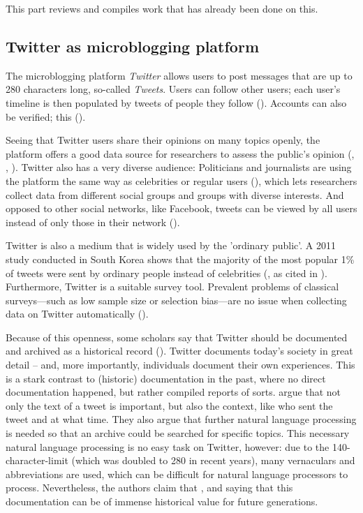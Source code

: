 This part reviews and compiles work that has already been done on this.

\subsection{Twitter as microblogging platform}
The microblogging platform \emph{Twitter} allows users to post messages that are up to 280 characters long, so-called \emph{Tweets}. Users can follow other users; each user's timeline is then populated by tweets of people they follow (\cite{thimm_twitter_2012}). Accounts can also be verified; this  (\cite{twitter_inc_about_nodate-1}). 

Seeing that Twitter users share their opinions on many topics openly, the platform offers a good data source for researchers to assess the public's opinion (\cite{pak2010twitter}, \cite{pfaffenberger2016twitter}, \cite{broniatowski2014twitter}). Twitter also has a very diverse audience: Politicians and journalists are using the platform the same way as celebrities or regular users (\cite{pak2010twitter}), which lets researchers collect data from different social groups and groups with diverse interests. And opposed to other social networks, like Facebook, tweets can be viewed by all users instead of only those in their network (\cite{park_does_2013}).

Twitter is also a medium that is widely used by the 'ordinary public'. A 2011 study conducted in South Korea shows that the majority of the most popular 1\% of tweets were sent by ordinary people instead of celebrities (\cite{chang2011structure}, as cited in \cite{park_does_2013}). Furthermore, Twitter is a suitable survey tool. Prevalent problems of classical surveys---such as low sample size or selection bias---are no issue when collecting data on Twitter automatically (\cite{takabe_twitter_2016}). 

Because of this openness, some scholars say that Twitter should be documented and archived as a historical record (\cite{risse2014documenting}). Twitter documents today's society in great detail -- and, more importantly, individuals document their own experiences. This is a stark contrast to (historic) documentation in the past, where no direct documentation happened, but rather compiled reports of sorts. \citeauthor{risse2014documenting} argue that not only the text of a tweet is important, but also the context, like who sent the tweet and at what time. They also argue that further natural language processing is needed so that an archive could be searched for specific topics. This necessary natural language processing is no easy task on Twitter, however: due to the 140-character-limit (which was doubled to 280 in recent years), many vernaculars and abbreviations are used, which can be difficult for natural language processors to process. Nevertheless, the authors claim that  \cite[9]{risse2014documenting}, and saying that this documentation can be of immense historical value for future generations.

